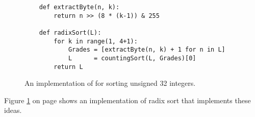 \begin{figure}[!ht]
\centering
\begin{verbatim}
    def extractByte(n, k):
        return n >> (8 * (k-1)) & 255

    def radixSort(L):
        for k in range(1, 4+1):
            Grades = [extractByte(n, k) + 1 for n in L]
            L      = countingSort(L, Grades)[0]
        return L
\end{verbatim}
\vspace*{-0.3cm}
\caption{An implementation of  for sorting unsigned 32 integers.}
\label{fig:radix-sort.stlx}
\end{figure}
Figure \ref{fig:radix-sort.stlx} on page \pageref{fig:radix-sort.stlx} shows an implementation of radix
sort that implements these ideas.
